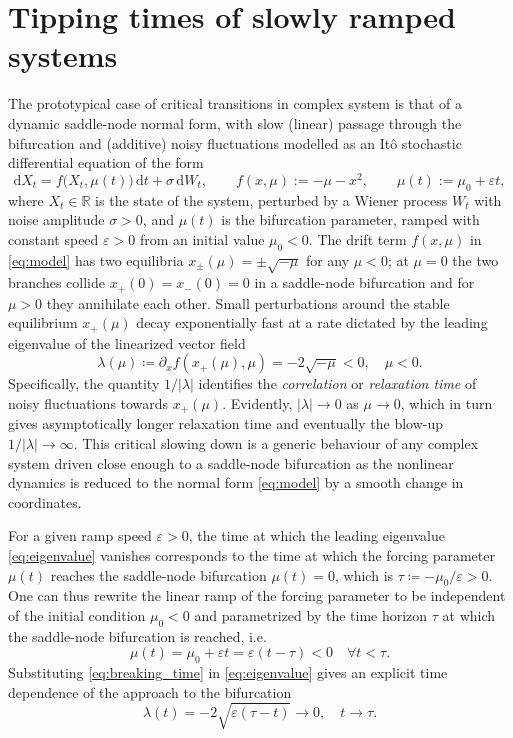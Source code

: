 \documentclass[openacc]{rsproca_new}
\newcommand{\dd}{\mathrm{d}}
\begin{document}
\section{Tipping times of slowly ramped systems}\label{sec:tipping}
The prototypical case of critical transitions in complex system is that of a dynamic saddle-node normal form, with slow (linear) passage through the bifurcation and (additive) noisy fluctuations modelled as an It\^o stochastic differential equation of the form
%
\begin{equation}\label{eq:model}
\dd X_t=f\bigl(X_t,\mu(t)\bigr)\,\dd t+\sigma\,\dd W_t,
\qquad
f(x,\mu):=-\mu-x^2,
\qquad
\mu(t):=\mu_0+\varepsilon t ,
\end{equation}
%
where $X_t\in\mathbb R$ is the state of the system, perturbed by a Wiener process $W_t$ with noise amplitude $\sigma>0$, and $\mu(t)$ is the bifurcation parameter, ramped with constant speed $\varepsilon>0$ from an initial value $\mu_0<0$.
The drift term $f(x,\mu)$ in \eqref{eq:model} has two equilibria $x_{\pm}(\mu)=\pm\sqrt{-\mu}$ for any $\mu<0$; at $\mu=0$ the two branches collide $x_+(0)=x_-(0)=0$ in a saddle-node bifurcation and for $\mu>0$ they annihilate each other.
Small perturbations around the stable equilibrium $x_+(\mu)$ decay exponentially fast at a rate dictated by the leading eigenvalue of the linearized vector field
%
\begin{equation}\label{eq:eigenvalue}
        \lambda(\mu)\coloneqq\partial_xf(x_+(\mu),\mu)=-2\sqrt{-\mu}<0 , \quad \mu<0 .
\end{equation}
%
Specifically, the quantity $1/|\lambda|$ identifies the \emph{correlation} or \emph{relaxation time} of noisy fluctuations towards $x_+(\mu)$.
Evidently, $|\lambda|\to0$ as $\mu\to0$, which in turn gives asymptotically longer relaxation time and eventually the blow-up $1/|\lambda|\to\infty$. 
This critical slowing down is a generic behaviour of any complex system driven close enough to a saddle-node bifurcation as the nonlinear dynamics is reduced to the normal form \eqref{eq:model} by a smooth change in coordinates.

For a given ramp speed $\varepsilon>0$, the time at which the leading eigenvalue \eqref{eq:eigenvalue} vanishes corresponds to the time at which the forcing parameter $\mu(t)$ reaches the saddle-node bifurcation $\mu(t)=0$, which is $\tau\coloneqq-\mu_0/\varepsilon>0$.
One can thus rewrite the linear ramp of the forcing parameter to be independent of the initial condition $\mu_0<0$ and parametrized by the time horizon $\tau$ at which the saddle-node bifurcation is reached, i.e.
%
\begin{equation}\label{eq:breaking_time}
        \mu(t) = \mu_0 + \varepsilon t = \varepsilon(t-\tau)<0\quad\forall t<\tau .
\end{equation}
%
Substituting \eqref{eq:breaking_time} in \eqref{eq:eigenvalue} gives an explicit time dependence of the approach to the bifurcation
%
\begin{equation}\label{eq:eigenvalue_time}
        \lambda(t) = -2\sqrt{\varepsilon(\tau-t)}\to0,\quad t\to\tau .
\end{equation}
\end{document}
